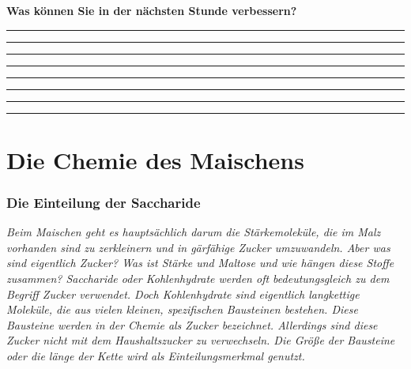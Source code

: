 \documentclass{scrartcl}  %
\begin{document}
\begin{center}
\begin{tcolorbox}
\begin{center}
\begin{tikzpicture}[scale=1]
							\end{tikzpicture}
						\end{center}
						\textbf{{\Large Was können Sie in der nächsten Stunde verbessern?}}
						\begin{center}
							\noindent\rule{12cm}{0.2pt}
							\vspace{1.1cm}
							\noindent\rule{12cm}{0.1pt}
							\vspace{1.1cm}
							\noindent\rule{12cm}{0.1pt}
							\vspace{1.1cm}
							\noindent\rule{12cm}{0.1pt}
							\vspace{1.1cm}
							\noindent\rule{12cm}{0.1pt}
							\vspace{1.1cm}
							\noindent\rule{12cm}{0.1pt}
							\vspace{1.1cm}
							\noindent\rule{12cm}{0.1pt}
							\vspace{1.1cm}
							\noindent\rule{12cm}{0.1pt}
						\end{center}
					\end{tcolorbox}
				\end{center}
								

\newpage
			
	\part{Die Chemie des Maischens}
	
	\section{Die Einteilung der Saccharide}
	
		\textit{Beim Maischen geht es hauptsächlich darum die Stärkemoleküle, die im Malz vorhanden sind zu zerkleinern und in gärfähige Zucker umzuwandeln. Aber was sind eigentlich Zucker? Was ist Stärke und Maltose und wie hängen diese Stoffe zusammen?
		Saccharide oder Kohlenhydrate werden oft bedeutungsgleich zu dem Begriff Zucker verwendet. Doch Kohlenhydrate sind eigentlich langkettige Moleküle, die aus vielen kleinen, spezifischen Bausteinen bestehen. Diese Bausteine werden in der Chemie als Zucker bezeichnet. Allerdings sind diese Zucker nicht mit dem Haushaltszucker zu verwechseln. Die Größe der Bausteine oder die länge der Kette wird als Einteilungsmerkmal genutzt.} \newline
		
\end{document}
